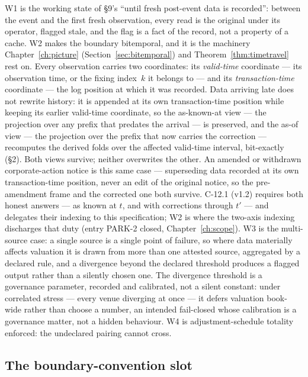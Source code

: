 \noindent W1 is the working state of \S 9's ``until fresh post-event data is recorded'':
between the event and the first fresh observation, every read is the original under its operator,
flagged stale, and the flag is a fact of the record, not a property of a cache. W2 makes the
boundary bitemporal, and it is the machinery Chapter~\ref{ch:picture}
(Section~\ref{sec:bitemporal}) and Theorem~\ref{thm:timetravel} rest on. Every observation
carries two coordinates: its \emph{valid-time} coordinate --- its observation time, or the
fixing index~$k$ it belongs to --- and its \emph{transaction-time} coordinate --- the log
position at which it was recorded. Data arriving late does not rewrite history: it is
appended at its own transaction-time position while keeping its earlier valid-time
coordinate, so the as-known-at view --- the projection over any prefix that predates the
arrival --- is preserved, and the as-of view --- the projection over the prefix that now
carries the correction --- recomputes the derived folds over the affected valid-time
interval, bit-exactly (\S 2). Both views survive; neither overwrites the other. An amended
or withdrawn corporate-action notice is this same case --- superseding data recorded at
its own transaction-time position, never an edit of the original notice, so the
pre-amendment frame and the corrected one both survive. C-12.1 (v1.2) requires both honest
answers --- as known at $t$, and with corrections through $t'$ --- and delegates their
indexing to this specification; W2 is where the two-axis indexing discharges that duty
(entry PARK-2 closed, Chapter~\ref{ch:scope}). W3 is the
multi-source case: a single source is a single point of
failure, so where data materially affects valuation it is drawn from more than one
attested source, aggregated by a declared rule, and a divergence beyond the declared
threshold produces a flagged output rather than a silently chosen one. The divergence
threshold is a governance parameter, recorded and calibrated, not a silent constant: under
correlated stress --- every venue diverging at once --- it defers valuation book-wide rather
than choose a number, an intended fail-closed whose calibration is a governance matter, not a
hidden behaviour. W4 is
adjustment-schedule totality enforced: the undeclared pairing cannot cross.

\subsection{The boundary-convention slot}\label{sec:slot}


